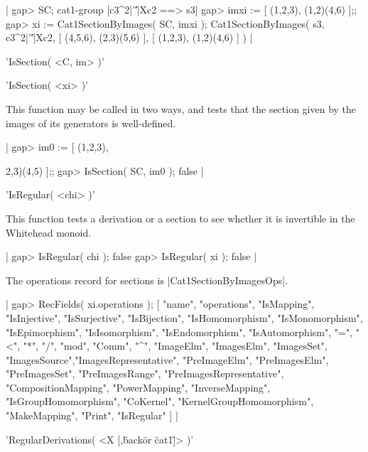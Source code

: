 |    gap> SC;
    cat1-group [c3^2|'\|'|Xc2 ==> s3] 
    gap> imxi := [ (1,2,3), (1,2)(4,6) ];;
    gap> xi := Cat1SectionByImages( SC, imxi );
    Cat1SectionByImages( s3, c3^2|'\|'|Xc2, [ (4,5,6), (2,3)(5,6) ], 
       [ (1,2,3), (1,2)(4,6) ] )  |

%

'IsSection( <C, im> )'

'IsSection( <xi> )'

This function may be called in two ways, and tests that the section given
by the images of its generators is well-defined.

|    gap> im0 := [ (1,2,3), {2,3)(4,5) ];;
    gap> IsSection( SC, im0 );
    false   |

%

'IsRegular( <chi> )'

This function tests a derivation or a section to see whether it is invertible
in the Whitehead monoid.

|    gap> IsRegular( chi );
    false
    gap> IsRegular( xi );
    false  |

%

The operations record for sections is |Cat1SectionByImagesOps|.

|    gap> RecFields( xi.operations );
    [ "name", "operations", "IsMapping", "IsInjective", "IsSurjective", 
      "IsBijection", "IsHomomorphism", "IsMonomorphism", "IsEpimorphism", 
      "IsIsomorphism", "IsEndomorphism", "IsAutomorphism", "=", "<", "*",
      "/", "mod", "Comm", "^", "ImageElm", "ImagesElm", "ImagesSet",
      "ImagesSource","ImagesRepresentative", "PreImageElm", "PreImagesElm",
      "PreImagesSet", "PreImagesRange", "PreImagesRepresentative",
      "CompositionMapping", "PowerMapping", "InverseMapping",
      "IsGroupHomomorphism", "CoKernel", "KernelGroupHomomorphism",
      "MakeMapping", "Print", "IsRegular" ]  |

%

'RegularDerivations( <X [,\"back\" {\rm or} \"cat1\"]> )'

}
